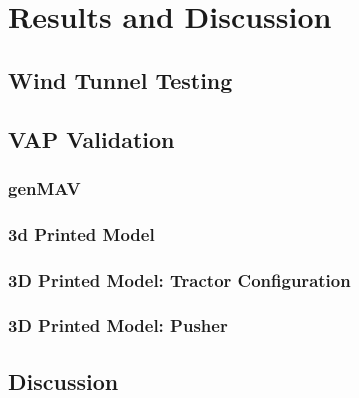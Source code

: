 \graphicspath{{./Figs/}}

\chapter{Results and Discussion}

\section{Wind Tunnel Testing}



\section{VAP Validation}

\subsection{genMAV}

\subsection{3d Printed Model}

\subsection{3D Printed Model: Tractor Configuration}

\subsection{3D Printed Model: Pusher}

\section{Discussion}